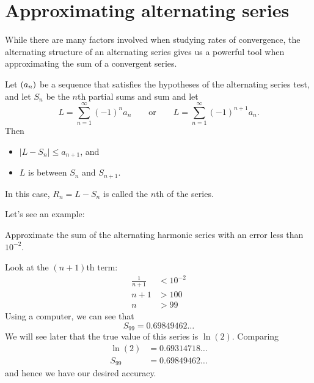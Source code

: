 \documentclass{ximera}
\begin{document}
\section{Approximating alternating series}


While there are many factors involved when studying rates of
convergence, the alternating structure of an alternating series gives
us a powerful tool when approximating the sum of a convergent series.

\begin{theorem}
Let $\left( a_n \right)$ be a sequence that satisfies the hypotheses of the
alternating series test, and let $S_n$ be the $n$th partial sums and
sum and let 
\[
L = \sum_{n=1}^\infty (-1)^{n}a_n\qquad\text{or}\qquad L=\sum_{n=1}^\infty (-1)^{n+1}a_n.
\]
Then
\begin{itemize}
\item $|L-S_n| \leq a_{n+1}$, and
\item $L$ is between $S_n$ and $S_{n+1}$.
\end{itemize}
In this case, $R_n=L-S_n$ is called the $n$th  of the
series.
\end{theorem}

Let's see an example:

\begin{example}
Approximate the sum of the alternating harmonic series with an error less than $10^{-2}$.
\begin{explanation}
  Look at the $(n+1)$th term:
	\begin{align*}
	\frac{1}{n+1} &< 10^{-2}\\
	n+1&> 100\\
	n&> 99 
	\end{align*}
	Using a computer, we can see that
        \[
        S_{99} = 0.69849462\dots
        \]
        We will see later that the true value of this series is $\ln(2)$. Comparing
        \begin{align*}
          \ln(2) &= 0.69314718\dots\\
          S_{99} &= 0.69849462\dots
        \end{align*}
        and hence we have our desired accuracy.
\end{explanation}
\end{example}

\end{document}
